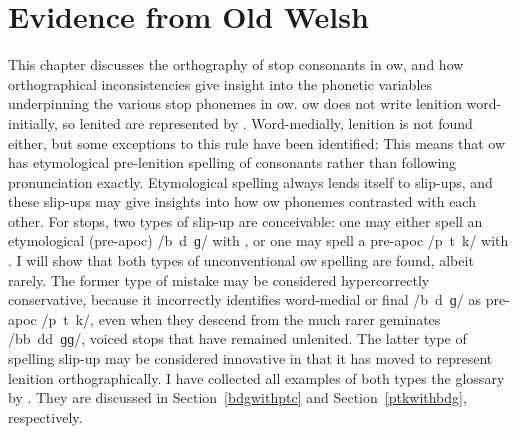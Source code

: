 \chapter{Evidence from Old Welsh}
\label{oldwelsh}
This chapter discusses the orthography of stop consonants in \gls{ow}, and how orthographical inconsistencies give insight into the phonetic variables underpinning the various stop phonemes in \gls{ow}.  \Gls{ow} does not write lenition word-initially, so lenited  are represented by . Word-medially, lenition is not found either, but some exceptions to this rule have been identified: 
This means that \gls{ow} has etymological pre-lenition spelling of consonants rather than following pronunciation exactly. Etymological spelling always lends itself to slip-ups, and these slip-ups may give insights into how \gls{ow} phonemes contrasted with each other. For stops, two types of slip-up are conceivable: one may either spell an etymological (pre-\gls{apoc}) /b~d~ɡ/ with , or one may spell a pre-\gls{apoc} /p~t~k/ with . I will show that both types of unconventional \gls{ow} spelling are found, albeit rarely. The former type of mistake may be considered hypercorrectly conservative, because it incorrectly identifies word-medial or final /b~d~ɡ/ as pre-\gls{apoc} /p~t~k/, even when they descend from the much rarer geminates /bb~dd~ɡɡ/, \ie voiced stops that have remained unlenited. The latter type of spelling slip-up may be considered innovative in that it has moved to represent lenition orthographically. I have collected all examples of both types the glossary by \textcite{falileyev_etymological_2000}. They are discussed in Section~\ref{bdgwithptc} and Section~\ref{ptkwithbdg}, respectively.





